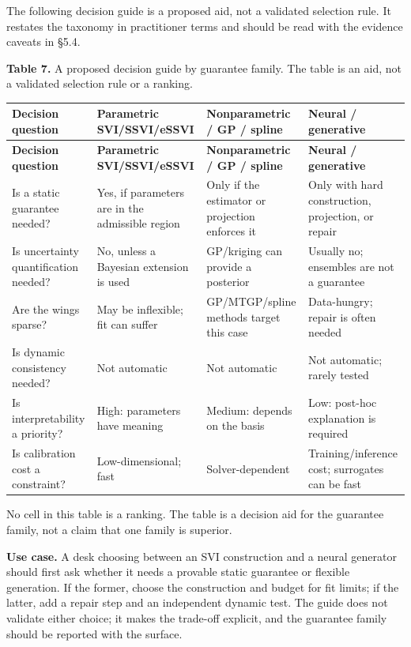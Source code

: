 \documentclass[11pt]{article}
\begin{document}
The following decision guide is a proposed aid, not a validated selection rule. It restates the taxonomy in practitioner terms and should be read with the evidence caveats in \S 5.4.

\textbf{Table 7.} A proposed decision guide by guarantee family. The table is an aid, not a validated selection rule or a ranking.

\begingroup
\begin{longtable}{@{}p{}p{}p{}p{}@{}}
\toprule
\textbf{Decision question} & \textbf{Parametric SVI/SSVI/eSSVI} & \textbf{Nonparametric / GP / spline} & \textbf{Neural / generative} \\
\midrule
\endfirsthead
\toprule
\textbf{Decision question} & \textbf{Parametric SVI/SSVI/eSSVI} & \textbf{Nonparametric / GP / spline} & \textbf{Neural / generative} \\
\midrule
\endhead
Is a static guarantee needed? & Yes, if parameters are in the admissible region & Only if the estimator or projection enforces it & Only with hard construction, projection, or repair \\
Is uncertainty quantification needed? & No, unless a Bayesian extension is used & GP/kriging can provide a posterior & Usually no; ensembles are not a guarantee \\
Are the wings sparse? & May be inflexible; fit can suffer & GP/MTGP/spline methods target this case & Data-hungry; repair is often needed \\
Is dynamic consistency needed? & Not automatic & Not automatic & Not automatic; rarely tested \\
Is interpretability a priority? & High: parameters have meaning & Medium: depends on the basis & Low: post-hoc explanation is required \\
Is calibration cost a constraint? & Low-dimensional; fast & Solver-dependent & Training/inference cost; surrogates can be fast \\
\bottomrule
\end{longtable}
\endgroup

No cell in this table is a ranking. The table is a decision aid for the guarantee family, not a claim that one family is superior.

\textbf{Use case.} A desk choosing between an SVI construction and a neural generator should first ask whether it needs a provable static guarantee or flexible generation. If the former, choose the construction and budget for fit limits; if the latter, add a repair step and an independent dynamic test. The guide does not validate either choice; it makes the trade-off explicit, and the guarantee family should be reported with the surface.
\end{document}
